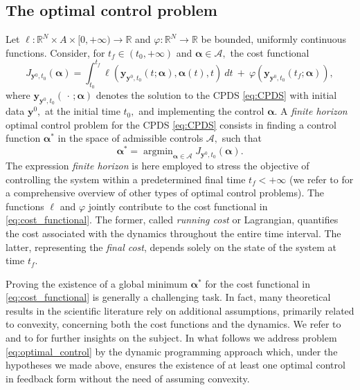 \documentclass[10pt]{article}
\theoremstyle{remark}
\newcommand{\R}{\mathbb{R}}
\newcommand{\A}{\mathcal{A}}
\DeclareMathOperator*{\argmin}{argmin}
\theoremstyle{definition}
\theoremstyle{remark}
\begin{document}
\subsection{The optimal control problem}

Let $\ell: \R^N \times A \times [0,+\infty) \to \R$ and $\varphi: \R^N \to \R$ be bounded, uniformly continuous functions. Consider, for $t_f \in (t_0,+\infty)$ and $\bm{\alpha}\in \mathcal{A},$ the cost functional 
\begin{equation}\label{eq:cost_functional}
J_{\bm{y}^0,t_0}(\bm{\alpha}) = \int_{t_0}^{t_f} \ell(\bm{y}_{\bm{y}^0,t_0} (t; \bm{\alpha}),\bm{\alpha}(t),t)\ dt\ +\ \varphi(\bm{y}_{\bm{y}^0,t_0}(t_f; \bm{\alpha})),
\end{equation}
where $\bm{y}_{\bm{y}^0,t_0} (\, \cdot \, ; \bm{\alpha})$ denotes the solution to the CPDS \eqref{eq:CPDS} with initial data $\bm{y}^0,$ at the initial time $t_0,$ and implementing the control $\bm{\alpha}.$ A \textit{finite horizon} optimal control problem for the CPDS \eqref{eq:CPDS} consists in finding a control function $\bm{\alpha}^*$ in the space of admissible controls $\A,$ such that
\begin{equation} \label{eq:optimal_control}
    \bm{\alpha}^* = \argmin_{\bm{\alpha} \in \A} J_{\bm{y}^0,t_0}(\bm{\alpha}).
\end{equation}
The expression \textit{finite horizon} is here employed to stress the objective of controlling the system within a predetermined final time $t_f<+\infty$ (we refer to \cite[Section 8.1]{FalconeFerretti} for a comprehensive overview of other types of optimal control problems). The functions $\ell$ and $\varphi$ jointly contribute to the cost functional in \eqref{eq:cost_functional}. The former, called \textit{running cost} or Lagrangian, quantifies the cost associated with the dynamics throughout the entire time interval. The latter, representing the \textit{final cost}, depends solely on the state of the system at time $t_f$.

Proving the existence of a global minimum $\bm{\alpha}^*$ for the cost functional in \eqref{eq:cost_functional} is generally a challenging task. In fact, many theoretical results in the scientific literature rely on additional assumptions, primarily related to convexity, concerning both the cost functions and the dynamics. We refer to \cite[Section III.3.4]{BardiCapuzzoDocetta2008} and to \cite{Cesari1965existence, roxin1962existence, dontchev2020approximating} for further insights on the subject. In what follows we address problem \eqref{eq:optimal_control} by the dynamic programming approach which, under the hypotheses we made above, ensures the existence of at least one optimal control in feedback form without the need of assuming convexity.
\end{document}
